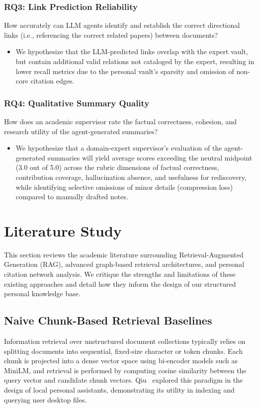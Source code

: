 \documentclass[runningheads]{llncs}
\begin{document}
\subsubsection{RQ3: Link Prediction Reliability}
How accurately can LLM agents identify and establish the correct directional links (i.e., referencing the correct related papers) between documents?
\begin{itemize}
    \item[\textbf{H3:}] We hypothesize that the LLM-predicted links overlap with the expert vault, but contain additional valid relations not cataloged by the expert, resulting in lower recall metrics due to the personal vault's sparsity and omission of non-core citation edges.
\end{itemize}

\subsubsection{RQ4: Qualitative Summary Quality}
How does an academic supervisor rate the factual correctness, cohesion, and research utility of the agent-generated summaries?
\begin{itemize}
    \item[\textbf{H4:}] We hypothesize that a domain-expert supervisor's evaluation of the agent-generated summaries will yield average scores exceeding the neutral midpoint (3.0 out of 5.0) across the rubric dimensions of factual correctness, contribution coverage, hallucination absence, and usefulness for rediscovery, while identifying selective omissions of minor details (compression loss) compared to manually drafted notes.
\end{itemize}


\section{Literature Study}
\label{sec:literature}

This section reviews the academic literature surrounding Retrieval-Augmented Generation (RAG), advanced graph-based retrieval architectures, and personal citation network analysis. We critique the strengths and limitations of these existing approaches and detail how they inform the design of our structured personal knowledge base.

\subsection{Naive Chunk-Based Retrieval Baselines}
Information retrieval over unstructured document collections typically relies on splitting documents into sequential, fixed-size character or token chunks. Each chunk is projected into a dense vector space using bi-encoder models such as MiniLM, and retrieval is performed by computing cosine similarity between the query vector and candidate chunk vectors. Qiu~\cite{qiu2024personal} explored this paradigm in the design of local personal assistants, demonstrating its utility in indexing and querying user desktop files.
\end{document}
